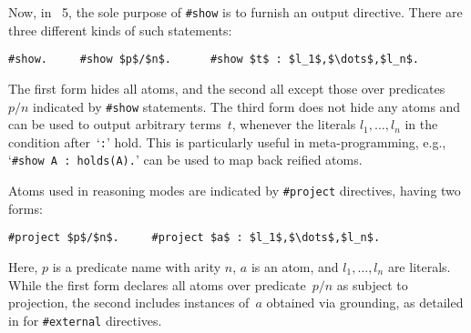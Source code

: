 Now, in \gringo~5, the sole purpose of \lstinline{#show} is to furnish an output directive.
There are three different kinds of such statements:
%
\begin{lstlisting}[numbers=none,mathescape=t]
#show.     #show $p$/$n$.      #show $t$ : $l_1$,$\dots$,$l_n$.
\end{lstlisting}
%
The first form hides all atoms, and the second all except those over predicates~$p/n$ indicated by \lstinline{#show} statements.
The third form does not hide any atoms and can be used to output arbitrary terms~$t$,
whenever the literals $l_1,\dots,l_n$ in the condition after~`\lstinline{:}' hold.
This is particularly useful in meta-programming,
e.g., `\lstinline{#show A : holds(A).}' can be used to map back reified atoms.

Atoms used in reasoning modes are indicated by \lstinline{#project} directives, having two forms:
%
\begin{lstlisting}[numbers=none,mathescape=t]
#project $p$/$n$.     #project $a$ : $l_1$,$\dots$,$l_n$.
\end{lstlisting}
%
Here, $p$ is a predicate name with arity $n$, $a$ is an atom, and $l_1,\dots,l_n$ are %
literals.
While the first form declares all atoms over predicate~$p/n$ as %
subject to projection,
the second includes instances of~$a$
obtained via grounding, as detailed in \cite{gekakasc14b} for
\lstinline{#external} directives.

